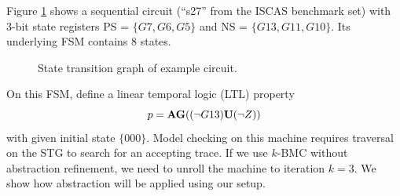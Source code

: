 \begin{Example}

\begin{figure}[H]
\label{fig:s27}
\end{figure}

Figure \ref{fig:s27} shows a sequential circuit (``s27'' from the
ISCAS benchmark set) with 3-bit state registers
PS = $\{G7,G6,G5\}$ and NS = $\{G13,G11,G10\}$. 
Its underlying FSM contains 8 states. 

\begin{figure}[H]
\caption{State transition graph of example circuit.}
\label{fig:s27_stg}
\end{figure}

On this FSM, define a linear temporal logic (LTL) property 
$$p = {\bf AG}( (\neg G13) {\bf U} (\neg Z) )$$ 
with given initial state $\{000\}$. Model checking on this machine requires
traversal on the STG to search for an accepting trace. If we use $k$-BMC
without abstraction refinement, we need to unroll the machine to
iteration  $k=3$. We show how abstraction will be applied using our
setup.


\end{Example}
